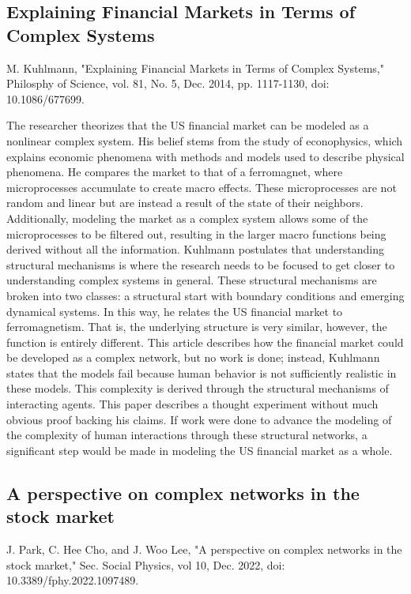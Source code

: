 \documentclass[12pt]{article}
\begin{document}
\subsection{Explaining Financial Markets in Terms of Complex Systems}
M. Kuhlmann, "Explaining Financial Markets in Terms of Complex Systems," Philosphy of Science, vol. 81, No. 5, Dec. 2014, pp. 1117-1130, doi: 10.1086/677699.

The researcher theorizes that the US financial market can be modeled as a nonlinear complex system. His belief stems from the study of econophysics, which explains economic phenomena with methods and models used to describe physical phenomena. He compares the market to that of a ferromagnet, where microprocesses accumulate to create macro effects. These microprocesses are not random and linear but are instead a result of the state of their neighbors. Additionally, modeling the market as a complex system allows some of the microprocesses to be filtered out, resulting in the larger macro functions being derived without all the information. Kuhlmann postulates that understanding structural mechanisms is where the research needs to be focused to get closer to understanding complex systems in general. These structural mechanisms are broken into two classes: a structural start with boundary conditions and emerging dynamical systems. In this way, he relates the US financial market to ferromagnetism. That is, the underlying structure is very similar, however, the function is entirely different. This article describes how the financial market could be developed as a complex network, but no work is done; instead, Kuhlmann states that the models fail because human behavior is not sufficiently realistic in these models. This complexity is derived through the structural mechanisms of interacting agents. This paper describes a thought experiment without much obvious proof backing his claims. If work were done to advance the modeling of the complexity of human interactions through these structural networks, a significant step would be made in modeling the US financial market as a whole.

\subsection{A perspective on complex networks in the stock market}
J. Park, C. Hee Cho, and J. Woo Lee, "A perspective on complex networks in the stock market," Sec. Social Physics, vol 10, Dec. 2022, doi: 10.3389/fphy.2022.1097489.
\end{document}
